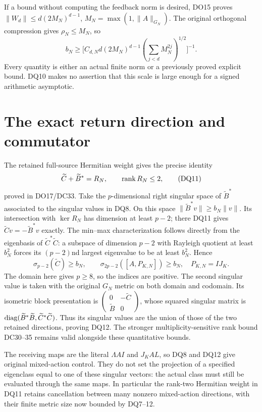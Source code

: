 \documentclass[11pt]{article}
\begin{document}
If a bound without computing the feedback norm is desired, DO15 proves
$\|W_d\|\le d(2M_N)^{d-1}$, $M_N=\max(1,\|A\|_{G_N})$.
The original orthogonal compression gives $\rho_N\le M_N$, so
\[
 b_N\ge
 \bigl[C_{d,N}d(2M_N)^{d-1}
         (\sum_{j<d}M_N^{2j})^{1/2}\bigr]^{-1}.
 \tag{DQ10}
\]
Every quantity is either an actual finite norm or a previously proved
explicit bound. DQ10 makes no assertion that this scale is large enough
for a signed arithmetic asymptotic.

\section{The exact return direction and commutator}
The retained full-source Hermitian weight gives the precise identity
\[
 \widetilde C+\widetilde B^*=R_N,\qquad\operatorname{rank} R_N\le2,
 \tag{DQ11}
\]
proved in DO17/DC33. Take the $p$-dimensional right singular space of
$\widetilde B^*$ associated to the singular values in DQ8.
On this space $\|\widetilde B^*v\|\ge b_N\|v\|$.
Its intersection with $\ker R_N$ has dimension at least $p-2$;
there DQ11 gives $\widetilde Cv=-\widetilde B^*v$ exactly.
The min--max characterization follows directly from the eigenbasis of
$\widetilde C^*\widetilde C$: a subspace of dimension $p-2$
with Rayleigh quotient at least $b_N^2$ forces its $(p-2)$nd largest
eigenvalue to be at least $b_N^2$. Hence
\[
 \boxed{\sigma_{p-2}(\widetilde C)\ge b_N,
 \qquad \sigma_{2p-2}([A,P_{K,N}])\ge b_N,}
 \quad P_{K,N}=IJ_K.\tag{DQ12}
\]
The domain here gives $p\ge8$, so the indices are positive.
The second singular value is taken with the original $G_N$ metric
on both domain and codomain. Its isometric block presentation is
$\left(\begin{smallmatrix}0&-\widetilde C\\\widetilde B&0\end{smallmatrix}\right)$,
whose squared singular matrix is
$\operatorname{diag}(\widetilde B^*\widetilde B,\widetilde C^*\widetilde C)$.
Thus its singular values are the union of those of the two retained
directions, proving DQ12. The stronger multiplicity-sensitive rank
bound DC30--35 remains valid alongside these quantitative bounds.

The receiving maps are the literal $\Lambda AI$ and $J_KAL$, so
DQ8 and DQ12 give original mixed-action control. They do not set
the projection of a specified eigenclass equal to one of these singular
vectors: the actual class must still be evaluated through the same maps.
In particular the rank-two Hermitian weight in DQ11 retains cancellation
between many nonzero mixed-action directions, with their finite metric
size now bounded by DQ7--12.
\end{document}
